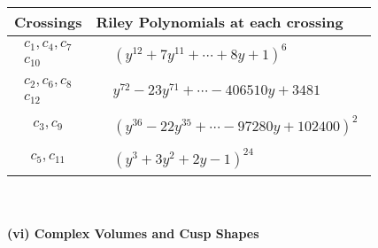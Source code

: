 \documentclass[1p]{elsarticle_modified}
\theoremstyle{definition}
\begin{document}
\begin{tabular}{m{50pt}|m{274pt}}
Crossings & \hspace{64pt}Riley Polynomials at each crossing \\
\hline $$\begin{aligned}c_{1},c_{4},c_{7}\\c_{10}\end{aligned}$$&$\begin{aligned}
&(y^{12}+7 y^{11}+\cdots+8 y+1)^{6}
\end{aligned}$\\
\hline $$\begin{aligned}c_{2},c_{6},c_{8}\\c_{12}\end{aligned}$$&$\begin{aligned}
&y^{72}-23 y^{71}+\cdots-406510 y+3481
\end{aligned}$\\
\hline $$\begin{aligned}c_{3},c_{9}\end{aligned}$$&$\begin{aligned}
&(y^{36}-22 y^{35}+\cdots-97280 y+102400)^{2}
\end{aligned}$\\
\hline $$\begin{aligned}c_{5},c_{11}\end{aligned}$$&$\begin{aligned}
&(y^3+3 y^2+2 y-1)^{24}
\end{aligned}$\\
\hline
\end{tabular}\\~\\
\newpage\flushleft \textbf{(vi) Complex Volumes and Cusp Shapes}
\end{document}
